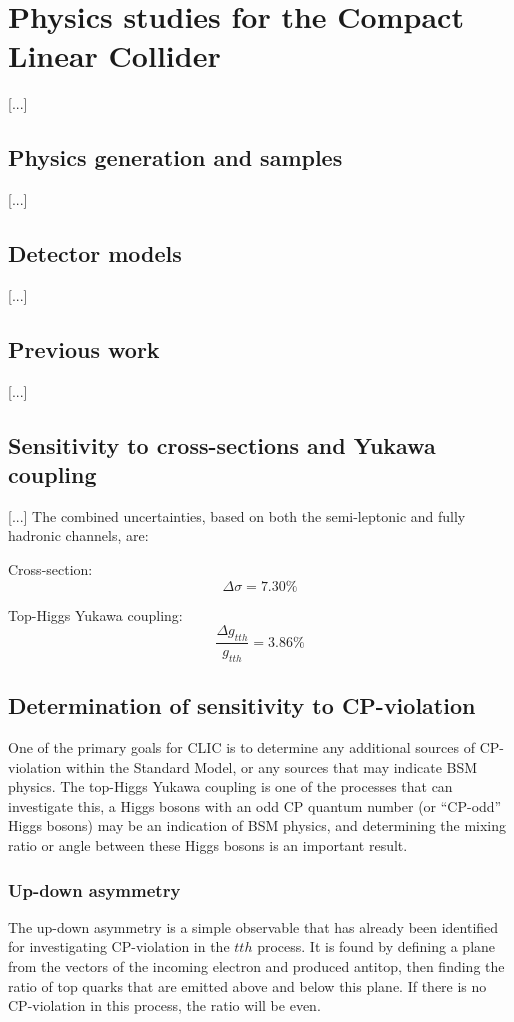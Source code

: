 \chapter{Physics studies for the Compact Linear Collider}
[...]

\section{Physics generation and samples}
[...]

\section{Detector models}
[...]

\section{Previous work}
[...]

\section{Sensitivity to cross-sections and Yukawa coupling}

[...] The combined uncertainties, based on both the semi-leptonic and fully hadronic channels, are:

Cross-section: $$\Delta\sigma = 7.30\% $$

Top-Higgs Yukawa coupling: $$ \frac{\Delta g_{tth}}{g_{tth}} = 3.86\% $$

\section{Determination of sensitivity to CP-violation}
One of the primary goals for CLIC is to determine any additional sources of CP-violation within	 the Standard Model, or any sources that may indicate BSM physics. The top-Higgs Yukawa coupling is one of the processes that can investigate this, a Higgs bosons with an odd CP quantum number (or ``CP-odd'' Higgs bosons) may be an indication of BSM physics, and determining the mixing ratio or angle between these Higgs bosons is an important result.

\subsection{Up-down asymmetry}
The up-down asymmetry is a simple observable that has already been identified for investigating CP-violation in the $tth$ process. It is found by defining a plane from the vectors of the incoming electron and produced antitop, then finding the ratio of top quarks that are emitted above and below this plane. If there is no CP-violation in this process, the ratio will be even.

